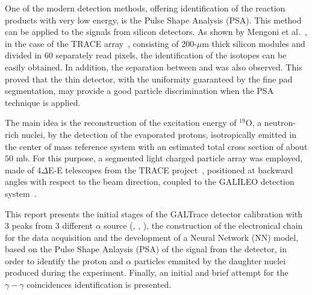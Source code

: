 One of the modern detection methods, offering identification of the reaction
products with very low energy, is the Pulse Shape Analysis (PSA). This method
can be applied to the signals from silicon detectors. As shown by Mengoni et
al.~\cite{mengoni}, in the case of the TRACE array~\cite{mengoni}, consisting
of 200-$\mu$m thick silicon modules and divided in 60 separately read pixels,
the identification of the  isotopes can be easily obtained.
In addition, the separation between  and  was also
observed. This proved that the thin detector, with the uniformity guaranteed
by the fine pad segmentation, may provide a good particle discrimination when
the PSA technique is applied.

\bigbreak

The main idea is the reconstruction of the excitation energy of $^{19}$O,
a neutron-rich nuclei, by the detection of the evaporated protons,
isotropically emitted in the center of mass reference system with an estimated total cross section of about $50$ mb. For this purpose, a segmented light
charged particle array was employed, made of 4$\Delta$E-E telescopes from the
TRACE project~\cite{mengoni}, positioned at backward angles with respect to
the beam direction, coupled to the GALILEO detection system~\cite{galileo}.

\bigbreak

This report presents the initial stages of the GALTrace detector calibration
with 3 peaks from 3 different $\alpha$ source (, ,
), the construction of the electronical chain for the data
acquisition and the development of a Neural Network (NN) model, based on the
Pulse Shape Anlaysis (PSA) of the signal from the detector, in order to
identify the proton and $\alpha$ particles emmited by the daughter nuclei
produced during the experiment. Finally, an initial and brief attempt for the
$\gamma-\gamma$ coincidences identification is presented.